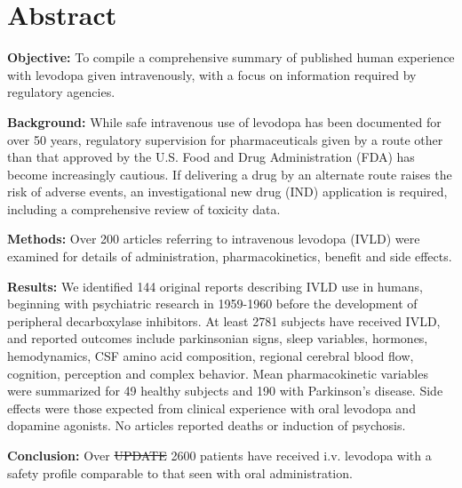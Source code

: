 \section{Abstract}
\textbf{Objective:} To compile a comprehensive summary of published human experience with levodopa given intravenously, with a focus on information required by regulatory agencies.

\textbf{Background:} While safe intravenous use of levodopa has been documented for over 50 years, regulatory supervision for pharmaceuticals given by a route other than that approved by the U.S. Food and Drug Administration (FDA) has become increasingly cautious. If delivering a drug by an alternate route raises the risk of adverse events, an investigational new drug (IND) application is required, including a comprehensive review of toxicity data.

\textbf{Methods:} Over 200 articles referring to intravenous levodopa (IVLD) were examined for details of administration, pharmacokinetics, benefit and side effects.

\textbf{Results:} We identified 144 original reports describing IVLD use in humans, beginning with psychiatric research in 1959-1960 before the development of peripheral decarboxylase inhibitors. At least 2781 subjects have received IVLD, and reported outcomes include parkinsonian signs, sleep variables, hormones, hemodynamics, CSF amino acid composition, regional cerebral blood ﬂow, cognition, perception and complex behavior. Mean pharmacokinetic variables were summarized for 49 healthy subjects and 190 with Parkinson's disease. Side effects were those expected from clinical experience with oral levodopa and dopamine agonists. No articles reported deaths or induction of psychosis.

\textbf{Conclusion:} Over \sout{UPDATE} 2600 patients have received i.v. levodopa with a safety profile comparable to that seen with oral administration.